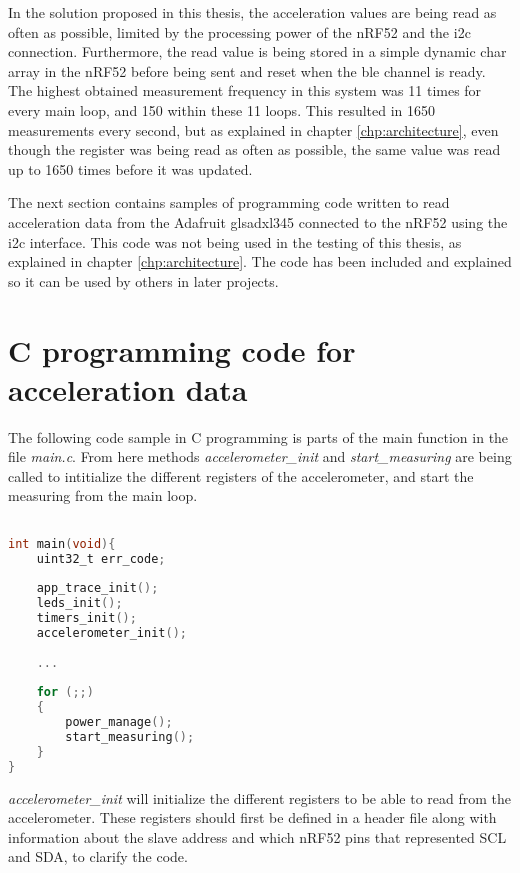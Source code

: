 \noindent In the solution proposed in this thesis, the acceleration values are being read as often as possible, limited by the processing power of the \gls{nRF52} and the \gls{i2c} connection. Furthermore, the read value is being stored in a simple dynamic char array in the \gls{nRF52} before being sent and reset when the \gls{ble} channel is ready. The highest obtained measurement frequency in this system was 11 times for every main loop, and 150 within these 11 loops. This resulted in 1650 measurements every second, but as explained in chapter \ref{chp:architecture}, even though the register was being read as often as possible, the same value was read up to 1650 times before it was updated. 

\noindent The next section contains samples of programming code written to read acceleration data from the Adafruit gls{adxl345} connected to the \gls{nRF52} using the \gls{i2c} interface. This code was not being used in the testing of this thesis, as explained in chapter \ref{chp:architecture}. The code has been included and explained so it can be used by others in later projects.

\section{C programming code for acceleration data} \label{subsec:progInC}

The following code sample in C programming is parts of the main function in the file \textit{main.c}. From here methods \textit{accelerometer\_init} and \textit{start\_measuring} are being called to intitialize the different registers of the accelerometer, and start the measuring from the main loop. 
\newpage
\begin{lstlisting}[language=C]

int main(void){
	uint32_t err_code; 
	
	app_trace_init(); 
	leds_init(); 
	timers_init();
	accelerometer_init(); 
	
	...
	
	for (;;)
	{
		power_manage();
		start_measuring();
	}
}
\end{lstlisting}


\textit{accelerometer\_init} will initialize the different registers to be able to read from the accelerometer. These registers should first be defined in a header file along with information about the slave address and which \gls{nRF52} pins that represented SCL and SDA, to clarify the code. 

